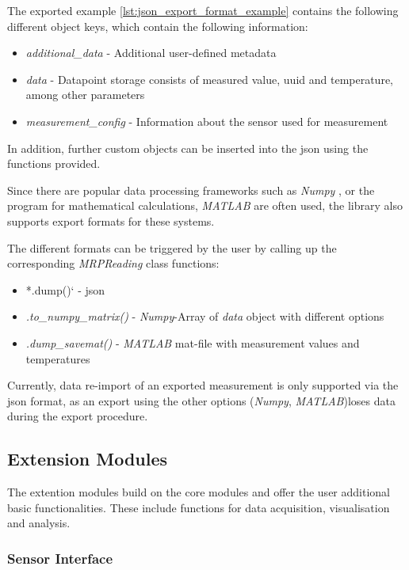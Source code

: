 The exported example \ref{lst:json_export_format_example} contains the
following different object keys, which contain the following
information:

\begin{itemize}
\tightlist
\item
  \emph{additional\_data} - Additional user-defined metadata
\item
  \emph{data} - Datapoint storage consists of measured value, \gls{uuid}
  and temperature, among other parameters
\item
  \emph{measurement\_config} - Information about the sensor used for
  measurement
\end{itemize}

In addition, further custom objects can be inserted into the \gls{json}
using the functions provided.

Since there are popular data processing frameworks such as \emph{Numpy}
\cite{harris2020array}, or the program for mathematical
calculations, \emph{MATLAB} are often used, the library also supports
export formats for these systems.

The different formats can be triggered by the user by calling up the
corresponding \emph{MRPReading} class functions:

\begin{itemize}
\tightlist
\item
  *.dump()` - \gls{json}
\item
  \emph{.to\_numpy\_matrix()} - \emph{Numpy}-Array of \emph{data} object
  with different options
\item
  \emph{.dump\_savemat()} - \emph{MATLAB} mat-file with measurement
  values and temperatures
\end{itemize}

Currently, data re-import of an exported measurement is only supported
via the \gls{json} format, as an export using the other options
(\emph{Numpy}, \emph{MATLAB})loses data during the export procedure.

\hypertarget{extension-modules}{%
\subsection{Extension Modules}\label{extension-modules}}

The extention modules build on the core modules and offer the user
additional basic functionalities. These include functions for data
acquisition, visualisation and analysis.

\hypertarget{sensor-interface}{%
\subsubsection{Sensor Interface}\label{sensor-interface}}

